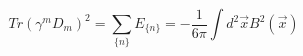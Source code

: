 \begin{equation}
Tr(\gamma^{m}D_{m})^{2}=\sum_{\{n\}}E_{\{n\}}=-\frac{1}{6\pi}\int
d^{2}\vec{x} B^{2}(\vec{x})\;
\end{equation}

